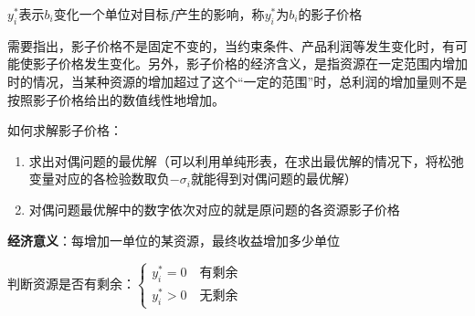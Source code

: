 \documentclass{book}
\begin{document}
$y_i^*$表示$b_i$变化一个单位对目标$f$产生的影响，称$y_i^*$为$b_i$的影子价格

需要指出，影子价格不是固定不变的，当约束条件、产品利润等发生变化时，有可能使影子价格发生变化。另外，影子价格的经济含义，是指资源在一定范围内增加时的情况，当某种资源的增加超过了这个“一定的范围”时，总利润的增加量则不是按照影子价格给出的数值线性地增加。

如何求解影子价格：
\begin{enumerate}
    \item 求出对偶问题的最优解（可以利用单纯形表，在求出最优解的情况下，将松弛变量对应的各检验数取负$-\sigma_i$就能得到对偶问题的最优解）
    \item 对偶问题最优解中的数字依次对应的就是原问题的各资源影子价格
\end{enumerate}

\textbf{经济意义}：每增加一单位的某资源，最终收益增加多少单位

判断资源是否有剩余：$\begin{cases}
    y_i^*=0\quad \mbox{有剩余}\\
    y_i^*>0\quad \mbox{无剩余}
\end{cases}$
\end{document}
